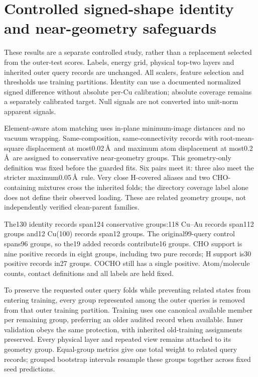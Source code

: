 \section{Controlled signed-shape identity and near-geometry safeguards}
These results are a separate controlled study, rather than a replacement selected from the outer-test scores. Labels, energy grid, physical top-two layers and inherited outer query records are unchanged. All scalers, feature selection and thresholds use training partitions. Identity can use a documented normalized signed difference without absolute per-Cu calibration; absolute coverage remains a separately calibrated target. Null signals are not converted into unit-norm apparent signals.

Element-aware atom matching uses in-plane minimum-image distances and no vacuum wrapping. Same-composition, same-connectivity records with root-mean-square displacement at most0.02\,\AA\ and maximum atom displacement at most0.2\,\AA\ are assigned to conservative near-geometry groups. This geometry-only definition was fixed before the guarded fits. Six pairs meet it: three also meet the stricter maximum0.05\,\AA\ rule. Very close H-covered aliases and two CHO-containing mixtures cross the inherited folds; the directory coverage label alone does not define their observed loading. These are related geometry groups, not independently verified clean-parent families.

The130 identity records span124 conservative groups:118 Cu--Au records span112 groups and12 Cu(100) records span12 groups. The original99-query control spans96 groups, so the19 added records contribute16 groups. CHO support is nine positive records in eight groups, including two pure records; H support is30 positive records in27 groups. COCHO still has a single positive. Atom/molecule counts, contact definitions and all labels are held fixed.

To preserve the requested outer query folds while preventing related states from entering training, every group represented among the outer queries is removed from that outer training partition. Training uses one canonical available member per remaining group, preferring an older audited record when available. Inner validation obeys the same protection, with inherited old-training assignments preserved. Every physical layer and repeated view remains attached to its geometry group. Equal-group metrics give one total weight to related query records; grouped bootstrap intervals resample these groups together across fixed seed predictions.

